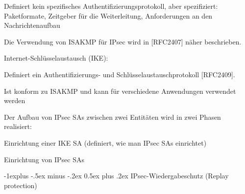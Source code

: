 \documentclass[a4paper]{article}
\makeatletter
\renewcommand{\subsection}{\@startsection{subsection}{2}{0mm}%
 {-1explus -.5ex minus -.2ex}%
 {0.5ex plus .2ex}%
 {\normalfont\normalsize\bfseries}}
\makeatother
\begin{document}
\begin{multicols}{3}
\begin{itemize*}
\begin{itemize*}
\begin{itemize*}
                        \item Definiert kein spezifisches Authentifizierungsprotokoll, aber spezifiziert: Paketformate, Zeitgeber für die Weiterleitung, Anforderungen an den Nachrichtenaufbau
                        \item Die Verwendung von ISAKMP für IPsec wird in {[}RFC2407{]} näher beschrieben.
                  \end{itemize*}
                  \item Internet-Schlüsselaustausch (IKE):
                  \begin{itemize*}
                        \item Definiert ein Authentifizierungs- und Schlüsselaustauschprotokoll {[}RFC2409{]}.
                        \item Ist konform zu ISAKMP und kann für verschiedene Anwendungen verwendet werden
                        \item Der Aufbau von IPsec SAs zwischen zwei Entitäten wird in zwei Phasen realisiert:
                        \item Einrichtung einer IKE SA (definiert, wie man IPsec SAs einrichtet)
                        \item Einrichtung von IPsec SAs
                  \end{itemize*}
            \end{itemize*}
      \end{itemize*}


      \subsection{IPsec-Wiedergabeschutz (Replay
            protection)}


\end{multicols}
\end{document}
